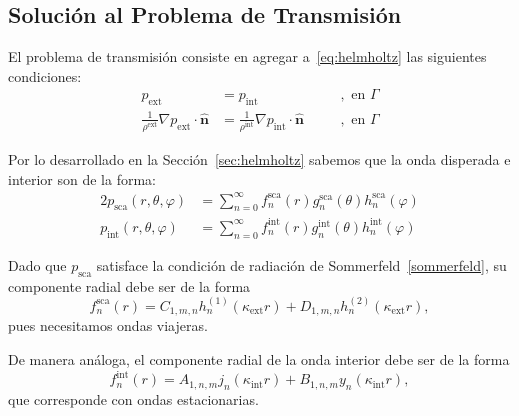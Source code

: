 \documentclass[11pt]{article}
\numberwithin{equation}{section}
\def\n{\hat{\textbf{n}}}
\def\exterior{\textrm{ext}}
\def\interior{\textrm{int}}
\def\sca{\textrm{sca}}
\begin{document}
\subsection{Solución al Problema de Transmisión}
\label{sec:a:transmission}

El problema de transmisión consiste en agregar a~\eqref{eq:helmholtz} las
siguientes condiciones:
\begin{subequations}\label{eq:transmision}
\begin{alignat}{2}
\label{eq:transmision:D}
	p_{\exterior} &= p_{\interior}
	&\quad&, \text{ en } \Gamma\\
\label{eq:transmision:N}
	\frac{1}{\rho^{\exterior}} \nabla p_{\exterior} \cdot \n
	&=
	\frac{1}{\rho^{\interior}} \nabla p_{\interior} \cdot \n
	&\quad&, \text{ en } \Gamma
\end{alignat}
\end{subequations}

Por lo desarrollado en la Sección~\ref{sec:helmholtz} sabemos que la onda
disperada e interior son de la forma:
\begin{alignat}{2}
	p_{\sca}(r,\theta,\varphi)
	&=
	\sum_{n=0}^{\infty} f^{\sca}_{n}(r) g^{\sca}_{n}(\theta) h^{\sca}_{n}(\varphi)
	\\
	p_{\interior}(r,\theta,\varphi)
	&=
	\sum_{n=0}^{\infty} f^{\interior}_{n}(r) g^{\interior}_{n}(\theta) h^{\interior}_{n}(\varphi)
\end{alignat}

Dado que \(p_{\sca}\) satisface la condición de radiación de
Sommerfeld~\eqref{sommerfeld}, su componente radial debe ser de la forma
\begin{equation}
	f^{\sca}_{n}(r)
	=
	C_{1,m,n} h^{(1)}_{n}(\kappa_{\exterior} r)
	+
	D_{1,m,n} h^{(2)}_{n}(\kappa_{\exterior} r),
\end{equation}
pues necesitamos ondas viajeras.

De manera análoga, el componente radial de la onda interior debe ser de la forma
\begin{equation}
	f^{\interior}_{n}(r)
	=
	A_{1,n,m} j_{n}(\kappa_{\interior} r)
	+
	B_{1,n,m} y_{n}(\kappa_{\interior} r),
\end{equation}
que corresponde con ondas estacionarias.
\end{document}
